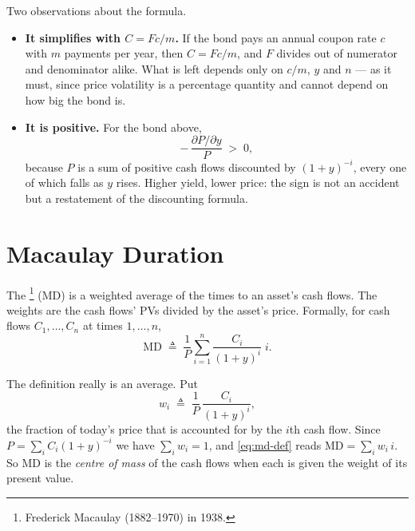 Two observations about the formula.

\begin{itemize}[itemsep=0.35em]
	\item \textbf{It simplifies with $C = Fc/m$.}
	      If the bond pays an annual coupon rate $c$ with $m$ payments per year, then $C = Fc/m$, and $F$ divides out of numerator and denominator alike.
	      What is left depends only on $c/m$, $y$ and $n$ --- as it must, since price volatility is a percentage quantity and cannot depend on how big the bond is.

	\item \textbf{It is positive.} For the bond above,
	      \[
		      -\,\frac{\partial P/\partial y}{P} \;>\; 0 ,
	      \]
	      because $P$ is a sum of positive cash flows discounted by $(1+y)^{-i}$, every one of which falls as $y$ rises.
	      Higher yield, lower price: the sign is not an accident but a restatement of the discounting formula.
\end{itemize}
\suppend

\section{Macaulay Duration}


\begin{definition}
	The \footnote{Frederick Macaulay (1882--1970) in 1938.} (MD) is a weighted average of the times to an asset's cash flows.
	The weights are the cash flows' PVs divided by the asset's price.
	Formally, for cash flows $C_{1},\dots,C_{n}$ at times $1,\dots,n$,
	\begin{equation}
		\mathrm{MD} \;\triangleq\; \frac{1}{P}\sum_{i=1}^{n}\frac{C_{i}}{(1+y)^{i}}\;i . \label{eq:md-def}
	\end{equation}
\end{definition}

\suppstart
The definition really is an average.
Put
\[
	w_{i} \;\triangleq\; \frac{1}{P}\,\frac{C_{i}}{(1+y)^{i}} ,
\]
the fraction of today's price that is accounted for by the $i$th cash flow.
Since $P=\sum_{i} C_{i}(1+y)^{-i}$ we have $\sum_{i} w_{i}=1$, and \eqref{eq:md-def} reads $\mathrm{MD}=\sum_{i} w_{i}\,i$.
So MD is the \emph{centre of mass} of the cash flows when each is given the weight of its present value.

